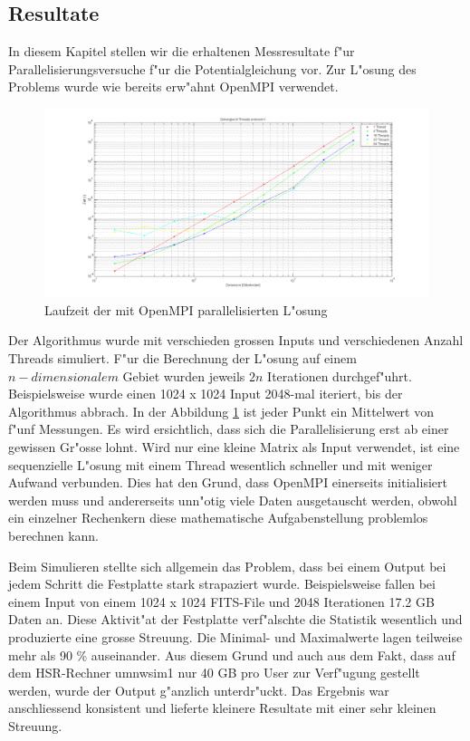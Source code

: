 \begin{refsection}
\section{Resultate}

In diesem Kapitel stellen wir die erhaltenen Messresultate f"ur
Parallelisierungsversuche f"ur die Potentialgleichung vor. Zur L"osung
des Problems wurde wie bereits erw"ahnt OpenMPI verwendet. 
	
\begin{figure}
\centering 
\includegraphics[width=\hsize]{potential/images/Resultate/dimension}
\caption{Laufzeit der mit OpenMPI parallelisierten L"osung}
\label{dimension}
\end{figure}
		
Der Algorithmus wurde mit verschieden grossen Inputs und
verschiedenen Anzahl Threads simuliert. F"ur die Berechnung der L"osung
auf einem $n-dimensionalem$ Gebiet wurden jeweils $2n$ Iterationen
durchgef"uhrt. Beispielsweise wurde einen 1024 x 1024 Input 2048-mal
iteriert, bis der Algorithmus abbrach. In der Abbildung \ref{dimension}
ist jeder Punkt ein Mittelwert von f"unf Messungen. Es wird ersichtlich,
dass sich die Parallelisierung erst ab einer gewissen Gr"osse lohnt. Wird
nur eine kleine Matrix als Input verwendet, ist eine sequenzielle
L"osung mit einem Thread wesentlich schneller und mit weniger Aufwand
verbunden. Dies hat den Grund, dass OpenMPI einerseits initialisiert
werden muss und andererseits unn"otig viele Daten ausgetauscht werden,
obwohl ein einzelner Rechenkern diese mathematische Aufgabenstellung
problemlos berechnen kann. 
	
Beim Simulieren stellte sich allgemein das Problem, dass
bei einem Output bei jedem Schritt die Festplatte stark strapaziert
wurde. Beispielsweise fallen bei einem Input von einem 1024 x 1024
FITS-File und 2048 Iterationen 17.2 GB Daten an. Diese Aktivit"at der
Festplatte verf"alschte die Statistik wesentlich und produzierte eine
grosse Streuung. Die Minimal- und Maximalwerte lagen teilweise mehr als
90 \% auseinander. Aus diesem Grund und auch aus dem Fakt, dass auf dem
HSR-Rechner umnwsim1 nur 40 GB pro User zur Verf"ugung gestellt werden,
wurde der Output g"anzlich unterdr"uckt. Das Ergebnis war anschliessend
konsistent und lieferte kleinere Resultate mit einer sehr kleinen
Streuung. 
	

\end{refsection}
